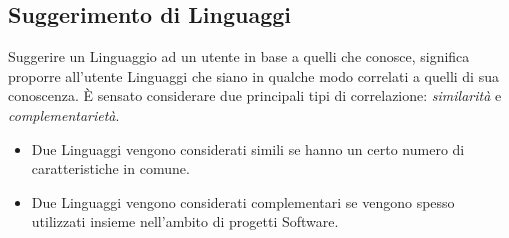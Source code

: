 \subsection{Suggerimento di Linguaggi}
Suggerire un Linguaggio ad un utente in base a quelli che conosce, significa proporre all'utente Linguaggi che siano in qualche modo correlati a quelli di sua conoscenza. È sensato considerare due principali tipi di correlazione: \emph{similarità} e \emph{complementarietà}.
\begin{itemize}
    \item Due Linguaggi vengono considerati simili se hanno un certo numero di caratteristiche in comune.
    \item Due Linguaggi vengono considerati complementari se vengono spesso utilizzati insieme nell'ambito di progetti Software.
\end{itemize}
